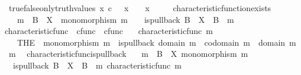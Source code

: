 \begin{isabellebody}
\ \ true{\isacharunderscore}{\kern0pt}false{\isacharunderscore}{\kern0pt}only{\isacharunderscore}{\kern0pt}truth{\isacharunderscore}{\kern0pt}values{\isacharcolon}{\kern0pt}\ {\isachardoublequoteopen}x\ {\isasymin}\isactrlsub c\ {\isasymOmega}\ {\isasymLongrightarrow}\ x\ {\isacharequal}{\kern0pt}\ {\isasymf}\ {\isasymor}\ x\ {\isacharequal}{\kern0pt}\ {\isasymt}{\isachardoublequoteclose}\ \isanewline
\ \ characteristic{\isacharunderscore}{\kern0pt}function{\isacharunderscore}{\kern0pt}exists{\isacharcolon}{\kern0pt}\isanewline
\ \ \ \ {\isachardoublequoteopen}m\ {\isacharcolon}{\kern0pt}\ B\ {\isasymrightarrow}\ X\ {\isasymLongrightarrow}\ monomorphism\ m\ {\isasymLongrightarrow}\ {\isasymexists}{\isacharbang}{\kern0pt}\ {\isasymchi}{\isachardot}{\kern0pt}\ is{\isacharunderscore}{\kern0pt}pullback\ B\ {\isasymone}\ X\ {\isasymOmega}\ {\isacharparenleft}{\kern0pt}{\isasymbeta}\isactrlbsub B\isactrlesub {\isacharparenright}{\kern0pt}\ {\isasymt}\ m\ {\isasymchi}{\isachardoublequoteclose}\isanewline
\isanewline
{}\isamarkupfalse%
\ characteristic{\isacharunderscore}{\kern0pt}func\ {\isacharcolon}{\kern0pt}{\isacharcolon}{\kern0pt}\ {\isachardoublequoteopen}cfunc\ {\isasymRightarrow}\ cfunc{\isachardoublequoteclose}\ \isanewline
\ \ {\isachardoublequoteopen}characteristic{\isacharunderscore}{\kern0pt}func\ m\ {\isacharequal}{\kern0pt}\isanewline
\ \ \ \ {\isacharparenleft}{\kern0pt}THE\ {\isasymchi}{\isachardot}{\kern0pt}\ monomorphism\ m\ {\isasymlongrightarrow}\ is{\isacharunderscore}{\kern0pt}pullback\ {\isacharparenleft}{\kern0pt}domain\ m{\isacharparenright}{\kern0pt}\ {\isasymone}\ {\isacharparenleft}{\kern0pt}codomain\ m{\isacharparenright}{\kern0pt}\ {\isasymOmega}\ {\isacharparenleft}{\kern0pt}{\isasymbeta}\isactrlbsub domain\ m\isactrlesub {\isacharparenright}{\kern0pt}\ {\isasymt}\ m\ {\isasymchi}{\isacharparenright}{\kern0pt}{\isachardoublequoteclose}\isanewline
\isanewline
{}\isamarkupfalse%
\ characteristic{\isacharunderscore}{\kern0pt}func{\isacharunderscore}{\kern0pt}is{\isacharunderscore}{\kern0pt}pullback{\isacharcolon}{\kern0pt}\isanewline
\ \ \ {\isachardoublequoteopen}m\ {\isacharcolon}{\kern0pt}\ B\ {\isasymrightarrow}\ X{\isachardoublequoteclose}\ {\isachardoublequoteopen}monomorphism\ m{\isachardoublequoteclose}\isanewline
\ \ \ {\isachardoublequoteopen}is{\isacharunderscore}{\kern0pt}pullback\ B\ {\isasymone}\ X\ {\isasymOmega}\ {\isacharparenleft}{\kern0pt}{\isasymbeta}\isactrlbsub B\isactrlesub {\isacharparenright}{\kern0pt}\ {\isasymt}\ m\ {\isacharparenleft}{\kern0pt}characteristic{\isacharunderscore}{\kern0pt}func\ m{\isacharparenright}{\kern0pt}{\isachardoublequoteclose}\isanewline

\end{isabellebody}
